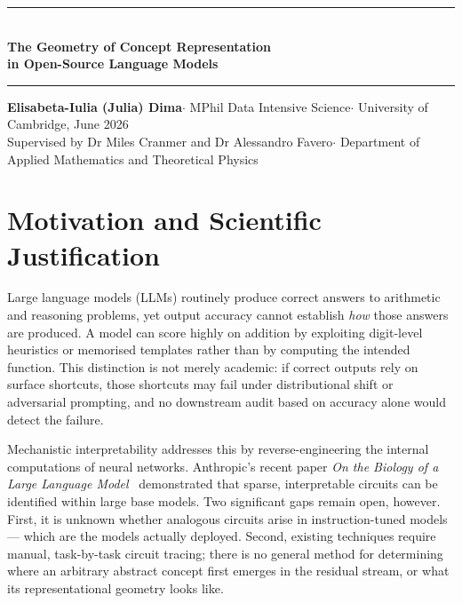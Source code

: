 \documentclass[11pt,a4paper]{article}
\begin{document}
\thispagestyle{fancy}

\noindent
{\color{rulecol}\rule{\linewidth}{1.8pt}}\\[4pt]
{\LARGE\bfseries The Geometry of Concept Representation\\[2pt]
in Open-Source Language Models}\\[6pt]
{\color{rulecol}\rule{\linewidth}{0.5pt}}

\vspace{8pt}
\noindent
{\normalsize
\textbf{Elisabeta-Iulia (Julia) Dima}\enspace$\cdot$\enspace
MPhil Data Intensive Science\enspace$\cdot$\enspace
University of Cambridge, June 2026
}\\[2pt]
\noindent
{\small\color{subtlegray}
Supervised by Dr Miles Cranmer and Dr Alessandro Favero\enspace$\cdot$\enspace
Department of Applied Mathematics and Theoretical Physics
}

\vspace{14pt}

\section{Motivation and Scientific Justification}

Large language models (LLMs) routinely produce correct answers to arithmetic and reasoning problems, yet output accuracy cannot establish \emph{how} those answers are produced. A model can score highly on addition by exploiting digit-level heuristics or memorised templates rather than by computing the intended function. This distinction is not merely academic: if correct outputs rely on surface shortcuts, those shortcuts may fail under distributional shift or adversarial prompting, and no downstream audit based on accuracy alone would detect the failure.

Mechanistic interpretability addresses this by reverse-engineering the internal computations of neural networks. Anthropic's recent paper \textit{On the Biology of a Large Language Model}~\cite{lindsey2025biology} demonstrated that sparse, interpretable circuits can be identified within large base models. Two significant gaps remain open, however. First, it is unknown whether analogous circuits arise in instruction-tuned models — which are the models actually deployed. Second, existing techniques require manual, task-by-task circuit tracing; there is no general method for determining where an arbitrary abstract concept first emerges in the residual stream, or what its representational geometry looks like.
\end{document}

